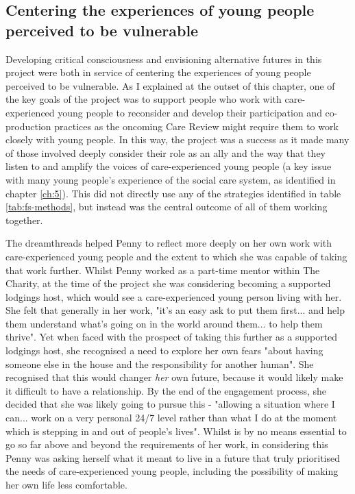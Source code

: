\subsection{Centering the experiences of young people perceived to be vulnerable}
Developing critical consciousness and envisioning alternative futures in this project were both in service of centering the experiences of young people perceived to be vulnerable. As I explained at the outset of this chapter, one of the key goals of the project was to support people who work with care-experienced young people to reconsider and develop their participation and co-production practices as the oncoming Care Review might require them to work closely with young people. In this way, the project was a success as it made many of those involved deeply consider their role as an ally and the way that they listen to and amplify the voices of care-experienced young people (a key issue with many young people's experience of the social care system, as identified in chapter \ref{ch:5}). This did not directly use any of the strategies identified in table \ref{tab:fs-methods}, but instead was the central outcome of all of them working together. 

The dreamthreads helped Penny to reflect more deeply on her own work with care-experienced young people and the extent to which she was capable of taking that work further. Whilst Penny worked as a part-time mentor within The Charity, at the time of the project she was considering becoming a supported lodgings host, which would see a care-experienced young person living with her. She felt that generally in her work, "it's an easy ask to put them first... and help them understand what's going on in the world around them... to help them thrive". Yet when faced with the prospect of taking this further as a supported lodgings host, she recognised a need to explore her own fears "about having someone else in the house and the responsibility for another human". She recognised that this would changer \textit{her} own future, because it would likely make it difficult to have a relationship. By the end of the engagement process, she decided that she was likely going to pursue this - "allowing a situation where I can... work on a very personal 24/7 level rather than what I do at the moment which is stepping in and out of people's lives". Whilst is by no means essential to go so far above and beyond the requirements of her work, in considering this Penny was asking herself what it meant to live in a future that truly prioritised the needs of care-experienced young people, including the possibility of making her own life less comfortable.

